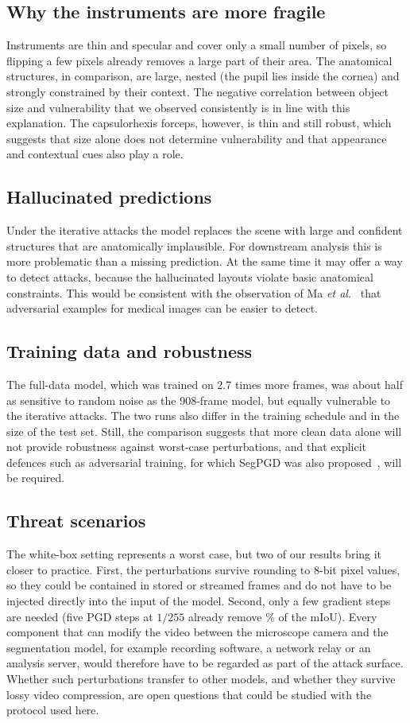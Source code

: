 \documentclass[conference]{IEEEtran}
\begin{document}
\subsection{Why the instruments are more fragile}
Instruments are thin and specular and cover only a small number of pixels, so flipping a few pixels already removes a large part of their area. The anatomical structures, in comparison, are large, nested (the pupil lies inside the cornea) and strongly constrained by their context. The negative correlation between object size and vulnerability that we observed consistently is in line with this explanation. The capsulorhexis forceps, however, is thin and still robust, which suggests that size alone does not determine vulnerability and that appearance and contextual cues also play a role.

\subsection{Hallucinated predictions}
Under the iterative attacks the model replaces the scene with large and confident structures that are anatomically implausible. For downstream analysis this is more problematic than a missing prediction. At the same time it may offer a way to detect attacks, because the hallucinated layouts violate basic anatomical constraints. This would be consistent with the observation of Ma \emph{et al.}~\cite{ma2021understanding} that adversarial examples for medical images can be easier to detect.

\subsection{Training data and robustness}
The full-data model, which was trained on 2.7 times more frames, was about half as sensitive to random noise as the 908-frame model, but equally vulnerable to the iterative attacks. The two runs also differ in the training schedule and in the size of the test set. Still, the comparison suggests that more clean data alone will not provide robustness against worst-case perturbations, and that explicit defences such as adversarial training, for which SegPGD was also proposed~\cite{gu2022segpgd}, will be required.

\subsection{Threat scenarios}
The white-box setting represents a worst case, but two of our results bring it closer to practice. First, the perturbations survive rounding to 8-bit pixel values, so they could be contained in stored or streamed frames and do not have to be injected directly into the input of the model. Second, only a few gradient steps are needed (five PGD steps at $1/255$ already remove \nPGDFiveOneFall\% of the mIoU). Every component that can modify the video between the microscope camera and the segmentation model, for example recording software, a network relay or an analysis server, would therefore have to be regarded as part of the attack surface. Whether such perturbations transfer to other models, and whether they survive lossy video compression, are open questions that could be studied with the protocol used here.
\end{document}
